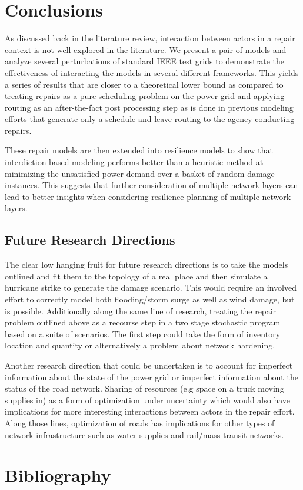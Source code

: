 \documentclass{article}
\begin{document}
	\section{Conclusions}
	
	As discussed back in the literature review, interaction between actors in a repair context is not well explored in the literature. We present a pair of models and analyze several perturbations of standard IEEE test grids to demonstrate the effectiveness of interacting the models in several different frameworks. This yields a series of results that are closer to a theoretical lower bound as compared to treating repairs as a pure scheduling problem on the power grid and applying routing as an after-the-fact post processing step as is done in previous modeling efforts that generate only a schedule and leave routing to the agency conducting repairs.
	
	These repair models are then extended into resilience models to show that interdiction based modeling performs better than a heuristic method at minimizing the unsatisfied power demand over a basket of random damage instances. This suggests that further consideration of multiple network layers can lead to better insights when considering resilience planning of multiple network layers.
	

	\subsection{Future Research Directions}
	The clear low hanging fruit for future research directions is to take the models outlined and fit them to the topology of a real place and then simulate a hurricane strike to generate the damage scenario. This would require an involved effort to correctly model both flooding/storm surge as well as wind damage, but is possible. Additionally along the same line of research, treating the repair problem outlined above as a recourse step in a two stage stochastic program based on a suite of scenarios. The first step could take the form of inventory location and quantity or alternatively a problem about network hardening.
	
	Another research direction that could be undertaken is to account for imperfect information about the state of the power grid or imperfect information about the status of the road network. Sharing of resources (e.g space on a truck moving supplies in) as a form of optimization under uncertainty which would also have implications for more interesting interactions between actors in the repair effort. Along those lines, optimization of roads has implications for other types of network infrastructure such as water supplies and rail/mass transit networks.
	\section{Bibliography}
	
	
\end{document}
